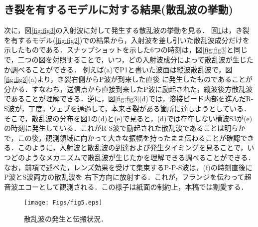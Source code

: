\documentclass{jsce}
\begin{document}
\subsection{き裂を有するモデルに対する結果(散乱波の挙動)}
次に，図\ref{fig:fig3}の入射波に対して発生する散乱波の挙動を見る．
図\ref{fig:fig5}は，き裂を有するモデル(\ref{fig:fig2})での結果から，入射波を差し引いた散乱波成分だけを示したものである．スナップショットを示した6つの時刻は，図\ref{fig:fig3}と同じで，二つの図を対照することで，いつ，どの入射波成分によって散乱波が生じたか調べることができる．
例えば(a)でP1と書いた波面は縦波散乱波で，図\ref{fig:fig3}(a)より，き裂右側からP波が到来した直後
に発生したものであることが分かる．すなわち，送信点から直接到来したP波に励起された，縦波後方散乱波であることが理解できる．逆に，図\ref{fig:fig3}(d)では，溶接ビード内部を進んだR-S波が，丁度，ウェブを通過して，本来き裂がある箇所に達しようとしている．そこで，散乱波の分布を図\ref{fig:fig5}の(d)と(e)で見ると，(d)では存在しない横波S3が(e)の時刻に発生している．これがR-S波で励起された散乱波であることは明らかで，この後，観測領域に向かって大きな振幅を持ったまま伝わることが確認できる．このように，入射波と散乱波の到達および発生タイミングを見ることで，いつどのようなメカニズムで散乱波が生じたかを理解できる調べることができる．
なお，前項で述べた，レンズ効果を受けて集束するP-P-S波は，(f)の時刻直後にP波とS波両方の散乱波を
右下方向に放射する．これが，フランジを伝わって超音波エコーとして観測される．この様子は紙面の制約上，本稿では割愛する．
\begin{figure}[h]
	\begin{center}
	\texttt{[image: Figs/fig5.eps]} 
	\end{center}
	\caption{
		散乱波の発生と伝搬状況．
	} 
	\label{fig:fig5}
\end{figure}
\end{document}
